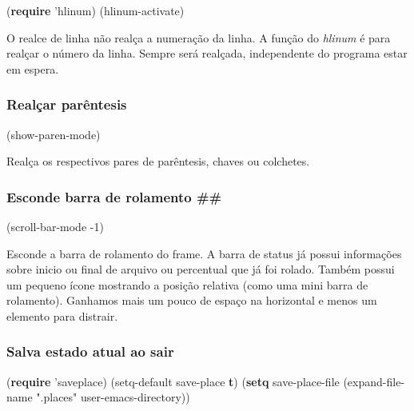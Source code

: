 \documentclass[]{article}
\newenvironment{Shaded}{}{}
\newcommand{\KeywordTok}[1]{\textcolor[rgb]{0.00,0.44,0.13}{\textbf{{#1}}}}
\newcommand{\DecValTok}[1]{\textcolor[rgb]{0.25,0.63,0.44}{{#1}}}
\newcommand{\StringTok}[1]{\textcolor[rgb]{0.25,0.44,0.63}{{#1}}}
\newcommand{\NormalTok}[1]{{#1}}
\begin{document}
\begin{Shaded}
\begin{Highlighting}[]
\NormalTok{(}\KeywordTok{require} \NormalTok{'hlinum)}
\NormalTok{(hlinum-activate)}
\end{Highlighting}
\end{Shaded}

O realce de linha não realça a numeração da linha. A função do
\emph{hlinum} é para realçar o número da linha. Sempre será realçada,
independente do programa estar em espera.

\subsubsection{Realçar parêntesis}\label{realuxe7ar-paruxeantesis}

\begin{Shaded}
\begin{Highlighting}[]
\NormalTok{(show-paren-mode)}
\end{Highlighting}
\end{Shaded}

Realça os respectivos pares de parêntesis, chaves ou colchetes.

\subsubsection{Esconde barra de rolamento
\#\#}\label{esconde-barra-de-rolamento}

\begin{Shaded}
\begin{Highlighting}[]
\NormalTok{(scroll-bar-mode -}\DecValTok{1}\NormalTok{)}
\end{Highlighting}
\end{Shaded}

Esconde a barra de rolamento do frame. A barra de status já possui
informações sobre inicio ou final de arquivo ou percentual que já foi
rolado. Também possui um pequeno ícone mostrando a posição relativa
(como uma mini barra de rolamento). Ganhamos mais um pouco de espaço na
horizontal e menos um elemento para distrair.

\subsubsection{Salva estado atual ao
sair}\label{salva-estado-atual-ao-sair}

\begin{Shaded}
\begin{Highlighting}[]
\NormalTok{(}\KeywordTok{require} \NormalTok{'saveplace)}
\NormalTok{(setq-default save-place }\KeywordTok{t}\NormalTok{)}
\NormalTok{(}\KeywordTok{setq} \NormalTok{save-place-file (expand-file-name }\StringTok{".places"} \NormalTok{user-emacs-directory))}
\end{Highlighting}
\end{Shaded}
\end{document}
